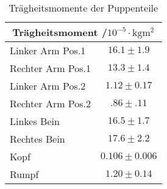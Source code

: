 \begin{table}[ht]
	\centering
	\begin{tabular}{lc}
	\toprule
	\multicolumn{2}{c}{Trägheitsmoment /$10^{-5}\cdot\si{\kilo\gram\meter\squared}$}\\
	\midrule
	Linker Arm Pos.1 &$16.1\pm1.9$\\
	Rechter Arm Pos.1 &$13.3\pm1.4$\\
	Linker Arm Pos.2 &$1.12\pm0.17$\\
	Rechter Arm Pos.2 &$.86\pm.11$\\
	Linkes Bein&$16.5\pm1.7$\\
	Rechtes Bein&$17.6\pm2.2$\\
	Kopf&$0.106\pm0.006$\\
	Rumpf&$1.20\pm0.14$\\
	\bottomrule
	\end{tabular}
	\caption{Trägheitsmomente der Puppenteile}
	\label{tab:M8 Tragheit}	
\end{table}
